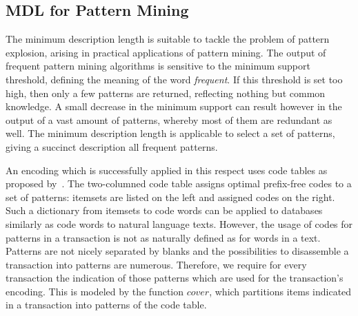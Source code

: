 \subsection{MDL for Pattern Mining}
The minimum description length is suitable to tackle the problem of pattern explosion, arising in practical applications of pattern mining. The output of frequent pattern mining algorithms is sensitive to the minimum support threshold, defining the meaning of the word \emph{frequent}. If this threshold is set too high, then only a few patterns are returned, reflecting nothing but common knowledge. A small decrease in the minimum support can result however in the output of a vast amount of patterns, whereby most of them are redundant as well. The minimum description length is applicable to select a set of patterns, giving a succinct description all frequent patterns.   

An encoding which is successfully applied in this respect uses code tables  as proposed by~\cite{siebes2006item}. 
The two-columned code table assigns optimal prefix-free codes to a set of patterns: itemsets are listed on the left and assigned codes on the right. Such a dictionary from itemsets to code words can be applied to databases similarly as code words to natural language texts. However, the usage of codes for patterns in a transaction is not as naturally defined as for words in a text. Patterns are not nicely separated by blanks and the possibilities to disassemble a transaction into patterns are numerous. Therefore, we require for every transaction the indication of those patterns  which are used for the transaction's encoding. This is modeled by the function $cover$, which partitions items indicated in a transaction into patterns of the code table. 


